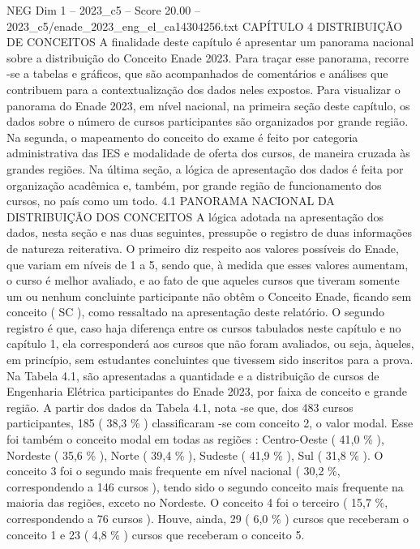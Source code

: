 \begin{textsample}{NEG Dim 1 – 2023\_c5 – Score 20.00 – 2023\_c5/enade\_2023\_eng\_el\_ca14304256.txt}  \label{ex:f1_neg_424}
CAPÍTULO 4 DISTRIBUIÇÃO DE CONCEITOS A finalidade deste capítulo é apresentar um panorama nacional sobre a distribuição do Conceito Enade 2023.
Para traçar esse panorama, recorre -se a tabelas e gráficos, que são acompanhados de comentários e análises que contribuem para a contextualização dos dados neles expostos.
Para visualizar o panorama do Enade 2023, em nível nacional, na primeira seção deste capítulo, os dados sobre o número de cursos participantes são organizados por grande região.
Na segunda, o mapeamento do conceito do exame é feito por categoria administrativa das IES e modalidade de oferta dos cursos, de maneira cruzada às grandes regiões.
Na última seção, a lógica de apresentação dos dados é feita por organização acadêmica e, também, por grande região de funcionamento dos cursos, no país como um todo. 4.1 PANORAMA NACIONAL DA DISTRIBUIÇÃO DOS CONCEITOS A lógica adotada na apresentação dos dados, nesta seção e nas duas seguintes, pressupõe o registro de duas informações de natureza reiterativa.
O primeiro diz respeito aos valores possíveis do Enade, que variam em níveis de 1 a 5, sendo que, à medida que esses valores aumentam, o curso é melhor avaliado, e ao fato de que aqueles cursos que tiveram somente um ou nenhum concluinte participante não obtêm o Conceito Enade, ficando sem conceito ( SC ), como ressaltado na apresentação deste relatório.
O segundo registro é que, caso haja diferença entre os cursos tabulados neste capítulo e no capítulo 1, ela corresponderá aos cursos que não foram avaliados, ou seja, àqueles, em princípio, sem estudantes concluintes que tivessem sido inscritos para a prova.
Na Tabela 4.1, são apresentadas a quantidade e a distribuição de cursos de Engenharia Elétrica participantes do Enade 2023, por faixa de conceito e grande região.
A partir dos dados da Tabela 4.1, nota -se que, dos 483 cursos participantes, 185 ( 38,3 \% ) classificaram -se com conceito 2, o valor modal.
Esse foi também o conceito modal em todas as regiões : Centro-Oeste ( 41,0 \% ), Nordeste ( 35,6 \% ), Norte ( 39,4 \% ), Sudeste ( 41,9 \% ), Sul ( 31,8 \% ).
O conceito 3 foi o segundo mais frequente em nível nacional ( 30,2 \%, correspondendo a 146 cursos ), tendo sido o segundo conceito mais frequente na maioria das regiões, exceto no Nordeste.
O conceito 4 foi o terceiro ( 15,7 \%, correspondendo a 76 cursos ).
Houve, ainda, 29 ( 6,0 \% ) cursos que receberam o conceito 1 e 23 ( 4,8 \% ) cursos que receberam o conceito 5.

\end{textsample}
